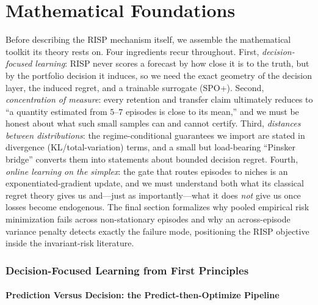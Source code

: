 \documentclass[11pt,a4paper]{article}
\theoremstyle{definition}
\theoremstyle{plain}
\newcommand{\nm}{\textsc{RISP}}
\begin{document}
\part{Mathematical Foundations}

Before describing the \nm{} mechanism itself, we assemble the mathematical
toolkit its theory rests on. Four ingredients recur throughout. First,
\emph{decision-focused learning}: \nm{} never scores a forecast by how close it
is to the truth, but by the portfolio decision it induces, so we need the exact
geometry of the decision layer, the induced regret, and a trainable surrogate
(SPO+). Second, \emph{concentration of measure}: every retention and transfer
claim ultimately reduces to ``a quantity estimated from $5$--$7$ episodes is
close to its mean,'' and we must be honest about what such small samples can
and cannot certify. Third, \emph{distances between distributions}: the
regime-conditional guarantees we import are stated in divergence
(KL/total-variation) terms, and a small but load-bearing ``Pinsker bridge''
converts them into statements about bounded decision regret. Fourth,
\emph{online learning on the simplex}: the gate that routes episodes to niches
is an exponentiated-gradient update, and we must understand both what its
classical regret theory gives us and---just as importantly---what it does
\emph{not} give us once losses become endogenous. The final section formalizes
why pooled empirical risk minimization fails across non-stationary episodes and
why an across-episode variance penalty detects exactly the failure mode,
positioning the \nm{} objective inside the invariant-risk literature.

\section{Decision-Focused Learning from First Principles}
\label{sec:dd1-dfl}

\subsection{Prediction Versus Decision: the Predict-then-Optimize Pipeline}
\label{sec:dd1-pto}
\end{document}
